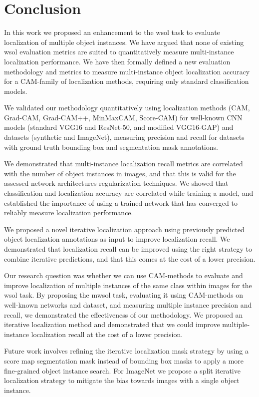 \chapter{Conclusion} \label{ch:conclusion}

In this work we proposed an enhancement to the \acrlong{wsol} task to evaluate localization of multiple object instances. We have argued that none of existing \acrshort{wsol} evaluation metrics are suited to quantitatively measure multi-instance localization performance. We have then formally defined a new evaluation methodology and metrics to measure multi-instance object localization accuracy for a CAM-family of localization methods, requiring only standard classification models.

We validated our methodology quantitatively using localization methods (CAM, Grad-CAM, Grad-CAM++, MinMaxCAM, Score-CAM) for well-known CNN models (standard VGG16 and ResNet-50, and modified VGG16-GAP) and datasets (synthetic and ImageNet), measuring precision and recall for datasets with ground truth bounding box and segmentation mask annotations.

We demonstrated that multi-instance localization recall metrics are correlated with the number of object instances in images, and that this is valid for the assessed network architectures regularization techniques. We showed that classification and localization accuracy are correlated while training a model, and established the importance of using a trained network that has converged to reliably measure localization performance.

We proposed a novel iterative localization approach using previously predicted object localization annotations as input to improve localization recall. We demonstrated that localization recall can be improved using the right strategy to combine iterative predictions, and that this comes at the cost of a lower precision.

Our research question was whether we can use CAM-methods to evaluate and improve localization of multiple instances of the same class within images for the \acrshort{wsol} task. By proposing the \acrshort{mwsol} task, evaluating it using CAM-methods on well-known networks and dataset, and measuring multiple instance precision and recall, we demonstrated the effectiveness of our methodology. We proposed an iterative localization method and demonstrated that we could improve multiple-instance localization recall at the cost of a lower precision.

Future work involves refining the iterative localization mask strategy by using a score map segmentation mask instead of bounding box masks to apply a more fine-grained object instance search. For ImageNet we propose a split iterative localization strategy to mitigate the bias towards images with a single object instance.
